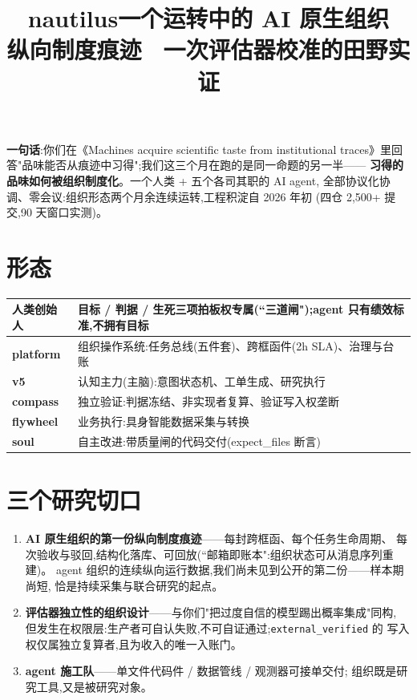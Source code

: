 \documentclass[10pt,a4paper]{ctexart}
\title{\vspace{-1.6em}\textcolor{acc}{nautilus}\;一个运转中的 AI 原生组织\\[0.2em]
\large 纵向制度痕迹 \textbullet\ 一次评估器校准的田野实证}
\author{}
\date{}
\begin{document}
\maketitle
\vspace{-3.2em}

\noindent\textbf{一句话}:你们在《Machines acquire scientific taste from institutional
traces》里回答"品味能否从痕迹中习得";我们这三个月在跑的是同一命题的另一半——
\textbf{习得的品味如何被组织制度化}。一个人类 + 五个各司其职的 AI agent,
全部协议化协调、零会议:组织形态两个月余连续运转,工程积淀自 2026 年初
(四仓 2{,}500+ 提交,90 天窗口实测)。

\section*{形态}
\noindent
\begin{tabular}{@{}p{2.6cm}p{12.6cm}@{}}
\toprule
\textbf{人类创始人} & 目标 / 判据 / 生死三项拍板权专属(``三道闸");agent 只有绩效标准,不拥有目标 \\
\midrule
\textbf{platform} & 组织操作系统:任务总线(五件套)、跨框函件(2h SLA)、治理与台账 \\
\textbf{v5} & 认知主力(主脑):意图状态机、工单生成、研究执行 \\
\textbf{compass} & 独立验证:判据冻结、非实现者复算、验证写入权垄断 \\
\textbf{flywheel} & 业务执行:具身智能数据采集与转换 \\
\textbf{soul} & 自主改进:带质量闸的代码交付(expect\_files 断言) \\
\bottomrule
\end{tabular}

\section*{三个研究切口}
\begin{enumerate}
\item \textbf{AI 原生组织的第一份纵向制度痕迹}——每封跨框函、每个任务生命周期、
每次验收与驳回,结构化落库、可回放(``邮箱即账本":组织状态可从消息序列重建)。
agent 组织的连续纵向运行数据,我们尚未见到公开的第二份——样本期尚短,
恰是持续采集与联合研究的起点。
\item \textbf{评估器独立性的组织设计}——与你们"把过度自信的模型踢出概率集成"同构,
但发生在权限层:生产者可自认失败,不可自证通过;\texttt{external\_verified} 的
写入权仅属独立复算者,且为收入的唯一入账门。
\item \textbf{agent 施工队}——单文件代码件 / 数据管线 / 观测器可接单交付;
组织既是研究工具,又是被研究对象。
\end{enumerate}
\end{document}
